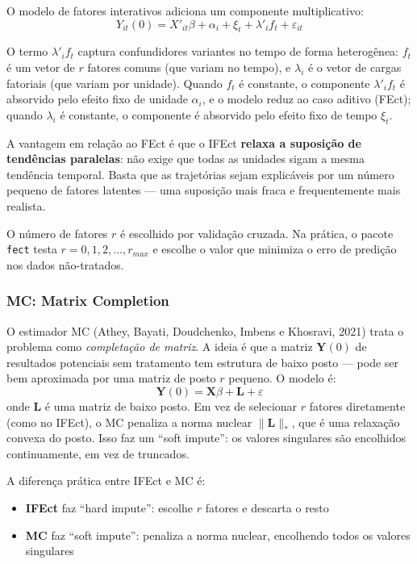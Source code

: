 \documentclass[
]{article}
\providecommand{\tightlist}{%
  \setlength{\itemsep}{0pt}\setlength{\parskip}{0pt}}
\begin{document}
O modelo de fatores interativos adiciona um componente multiplicativo:
\[
Y_{it}(0) = X'_{it}\beta + \alpha_i + \xi_t + \lambda'_i f_t + \varepsilon_{it}
\]

O termo \(\lambda'_i f_t\) captura confundidores variantes no tempo de forma heterogênea: \(f_t\) é um vetor de \(r\) fatores comuns (que variam no tempo), e \(\lambda_i\) é o vetor de cargas fatoriais (que variam por unidade). Quando \(f_t\) é constante, o componente \(\lambda'_i f_t\) é absorvido pelo efeito fixo de unidade \(\alpha_i\), e o modelo reduz ao caso aditivo (FEct); quando \(\lambda_i\) é constante, o componente é absorvido pelo efeito fixo de tempo \(\xi_t\).

A vantagem em relação ao FEct é que o IFEct \textbf{relaxa a suposição de tendências paralelas}: não exige que todas as unidades sigam a mesma tendência temporal. Basta que as trajetórias sejam explicáveis por um número pequeno de fatores latentes --- uma suposição mais fraca e frequentemente mais realista.

O número de fatores \(r\) é escolhido por validação cruzada. Na prática, o pacote \texttt{fect} testa \(r = 0, 1, 2, \ldots, r_{max}\) e escolhe o valor que minimiza o erro de predição nos dados não-tratados.

\subsubsection{MC: Matrix Completion}\label{mc-matrix-completion}

O estimador MC (Athey, Bayati, Doudchenko, Imbens e Khosravi, 2021) trata o problema como \emph{completação de matriz}. A ideia é que a matriz \(\mathbf{Y}(0)\) de resultados potenciais sem tratamento tem estrutura de baixo posto --- pode ser bem aproximada por uma matriz de posto \(r\) pequeno. O modelo é:
\[
\mathbf{Y}(0) = \mathbf{X}\beta + \mathbf{L} + \varepsilon
\]
onde \(\mathbf{L}\) é uma matriz de baixo posto. Em vez de selecionar \(r\) fatores diretamente (como no IFEct), o MC penaliza a norma nuclear \(\|\mathbf{L}\|_*\), que é uma relaxação convexa do posto. Isso faz um ``soft impute'': os valores singulares são encolhidos continuamente, em vez de truncados.

A diferença prática entre IFEct e MC é:

\begin{itemize}
\tightlist
\item
  \textbf{IFEct} faz ``hard impute'': escolhe \(r\) fatores e descarta o resto
\item
  \textbf{MC} faz ``soft impute'': penaliza a norma nuclear, encolhendo todos os valores singulares
\end{itemize}
\end{document}

